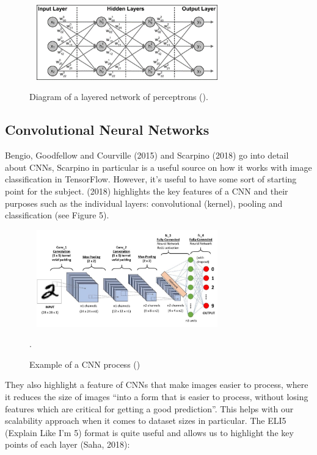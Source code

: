 \documentclass{article}
\begin{document}
\begin{figure}[h]\
    \centering
    \includegraphics[width=0.7\textwidth]{network.png}
    \caption{Diagram of a layered network of perceptrons (\cite{ScarpinoMatthew2018Tfd}).}
\end{figure}

\subsection{Convolutional Neural Networks}

Bengio, Goodfellow and Courville (2015) and Scarpino (2018) go into detail about CNNs, Scarpino in particular is a
useful source on how it works with image classification in TensorFlow. However, it's useful to have 
some sort of starting point for the subject. \citeauthor{saha2018} (2018) highlights the key features of a CNN and their
purposes such as the individual layers: convolutional (kernel),  pooling and classification (see Figure 5).

\begin{figure}[h]\
    \centering
    \includegraphics[width=0.7\textwidth]{saha.jpg}
    \caption{Example of a CNN process (\cite{saha2018})}.
\end{figure}
\break

They also highlight a feature of CNNs that make images easier to process, where it reduces the size of images “into a 
form that is easier to process, without losing features which are critical for getting a good prediction”. This helps 
with our scalability approach when it comes to dataset sizes in particular. The ELI5 (Explain Like I'm 5) format is 
quite useful and allows us to highlight the key points of each layer (Saha, 2018):
\end{document}
